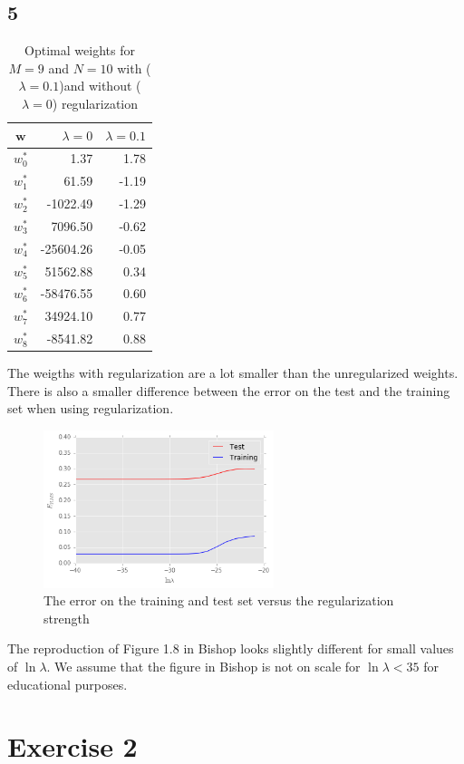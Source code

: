\documentclass{article}
\begin{document}
\subsection*{5}
\begin{table}[H]
\centering
\begin{tabular}{c | r | r}
$\textbf{w}$ & $\lambda=0$ & $\lambda=0.1$ \\
\hline
$w^*_0$ & 1.37 & 1.78 \\
$w^*_1$ & 61.59 & -1.19 \\
$w^*_2$ & -1022.49 & -1.29\\
$w^*_3$ & 7096.50 & -0.62 \\
$w^*_4$ & -25604.26 & -0.05 \\
$w^*_5$ & 51562.88 & 0.34 \\
$w^*_6$ & -58476.55 & 0.60 \\
$w^*_7$ & 34924.10 & 0.77 \\ 
$w^*_8$ & -8541.82 & 0.88 
\end{tabular}
\caption{Optimal weights for $M=9$ and $N=10$ with ($\lambda=0.1$)and without ($\lambda=0$) regularization}
\end{table}

The weigths with regularization are a lot smaller than the unregularized weights. There is also a smaller difference between the error on the test and the training set when using regularization.

\begin{figure}[H]
\centering
\includegraphics[width=0.6\textwidth]{images/effect_regularization.png}
\caption{The error on the training and test set versus the regularization strength}
\end{figure}
The reproduction of Figure 1.8 in Bishop looks slightly different for small values of $\ln \lambda$. We assume that the figure in Bishop is not on scale for $\ln \lambda < 35$ for educational purposes.

\section*{Exercise 2}
\end{document}
